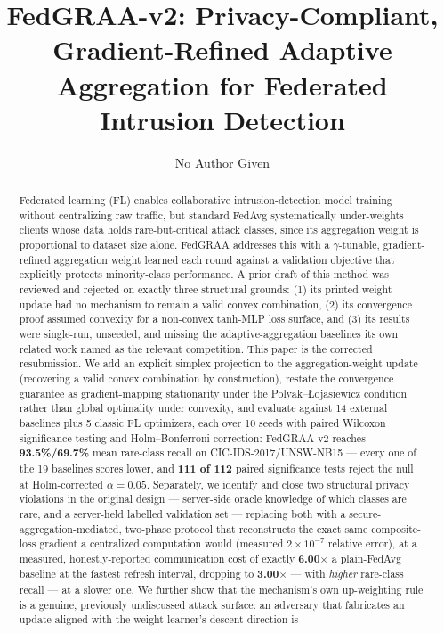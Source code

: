\documentclass{llncs}
\begin{document}
\title{FedGRAA-v2: Privacy-Compliant, Gradient-Refined Adaptive Aggregation for Federated Intrusion Detection}

%
%
\author{No Author Given}

\maketitle

\begin{abstract}
Federated learning (FL) enables collaborative intrusion-detection model training without centralizing raw traffic, but standard FedAvg systematically under-weights clients whose data holds rare-but-critical attack classes, since its aggregation weight is proportional to dataset size alone. FedGRAA addresses this with a $\gamma$-tunable, gradient-refined aggregation weight learned each round against a validation objective that explicitly protects minority-class performance. A prior draft of this method was reviewed and rejected on exactly three structural grounds: (1) its printed weight update had no mechanism to remain a valid convex combination, (2) its convergence proof assumed convexity for a non-convex tanh-MLP loss surface, and (3) its results were single-run, unseeded, and missing the adaptive-aggregation baselines its own related work named as the relevant competition. This paper is the corrected resubmission. We add an explicit simplex projection to the aggregation-weight update (recovering a valid convex combination by construction), restate the convergence guarantee as gradient-mapping stationarity under the Polyak--{\L}ojasiewicz condition rather than global optimality under convexity, and evaluate against 14 external baselines plus 5 classic FL optimizers, each over 10 seeds with paired Wilcoxon significance testing and Holm--Bonferroni correction: FedGRAA-v2 reaches \textbf{93.5\%/69.7\%} mean rare-class recall on CIC-IDS-2017/UNSW-NB15 --- every one of the 19 baselines scores lower, and \textbf{111 of 112} paired significance tests reject the null at Holm-corrected $\alpha=0.05$. Separately, we identify and close two structural privacy violations in the original design --- server-side oracle knowledge of which classes are rare, and a server-held labelled validation set --- replacing both with a secure-aggregation-mediated, two-phase protocol that reconstructs the exact same composite-loss gradient a centralized computation would (measured $2\times10^{-7}$ relative error), at a measured, honestly-reported communication cost of exactly \textbf{6.00$\times$} a plain-FedAvg baseline at the fastest refresh interval, dropping to \textbf{3.00$\times$} --- with \emph{higher} rare-class recall --- at a slower one. We further show that the mechanism's own up-weighting rule is a genuine, previously undiscussed attack surface: an adversary that fabricates an update aligned with the weight-learner's descent direction is 
\end{abstract}
\end{document}
